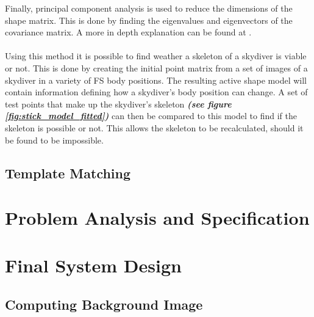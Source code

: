 \documentclass[a4paper, 12pt]{article}
\begin{document}
Finally, principal component analysis is used to reduce the dimensions of the shape matrix. This is done by finding the eigenvalues and eigenvectors of the covariance matrix. A more in depth explanation can be found at \cite{icl_pca}.\\
\\
Using this method it is possible to find weather a skeleton of a skydiver is viable or not. This is done by creating the initial point matrix from a set of images of a skydiver in a variety of FS body positions. The resulting active shape model will contain information defining how a skydiver's body position can change. A set of test points that make up the skydiver's skeleton \textbf{\emph{(see figure \ref{fig:stick_model_fitted})}} can then be compared to this model to find if the skeleton is possible or not. This allows the skeleton to be recalculated, should it be found to be impossible.
%
%
\subsection{Template Matching}


\section{Problem Analysis and Specification}
\section{Final System Design}

	\subsection{Computing Background Image}
\end{document}
